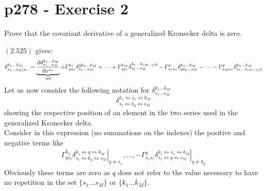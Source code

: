 \section{p278 - Exercise 2 }
\begin{tcolorbox}
Prove that the covariant derivative of a generalized Kronecker delta is zero.
\end{tcolorbox}
$\mathbf{(2.525)}$  gives: 
\begin{align}
\delta^{k_1\dots k_M}_{s_1 \dots s_M|s_{\tau}} &= \underbrace{\pdv{\delta^{k_1\dots k_M}_{s_1 \dots s_M}}{x^{s_{\tau}}}}_\text{=0} + \Gamma^{k_1}_{q s_{\tau}}\delta^{q k_2\dots k_M}_{s_1 \dots s_M}+ \dots +\Gamma^{k_M}_{q s_{\tau}}\delta^{ k_1\dots k_{(M-1)}q}_{s_1 \dots s_M} - \Gamma^{q}_{ s_1 s_{\tau}}\delta^{ k_1\dots k_{M}}_{qs_2 \dots s_M} -\dots -\Gamma^{q}_{ s_M s_{\tau}}\delta^{ k_1\dots k_{M}}_{s_1 \dots s_{(M-1)}q}\\
\end{align}
Let us now consider the following notation for $\delta^{k_1\dots k_M}_{s_1 \dots s_M}$
$$\delta^{k_1 \leftrightsquigarrow s_x\leftrightsquigarrow  k_M}_{s_1 \leftrightsquigarrow k_y\leftrightsquigarrow s_M}$$
showing the respective position of an element in the two series used in the generalized Kronecker delta.\\
Consider in this expression (no summations on the indexes) the positive and negative terms like
\begin{align}
\left.\Gamma^{k_y}_{q s_{\tau}}\delta^{k_1 \leftrightsquigarrow q\leftrightsquigarrow  k_M}_{s_1 \leftrightsquigarrow k_y\leftrightsquigarrow s_M}\right|_{q\ne s_x},\dots ,- \left.\Gamma^{q}_{ s_x s_{\tau}}\delta^{k_1 \leftrightsquigarrow s_x\leftrightsquigarrow  k_M}_{s_1 \leftrightsquigarrow q\leftrightsquigarrow s_M}\right|_{q\ne k_y}
\end{align} 
Obviously these terms are zero as $q$ does not refer to the value necessary to have no repetition in the set $\{s_1 \dots s_M\}$ or $\{k_1 \dots k_M\}$.\\

